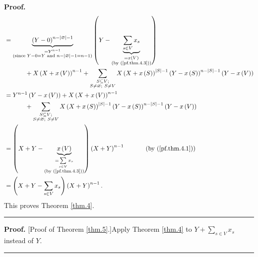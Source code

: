 \documentclass[numbers=enddot,12pt,final,onecolumn,notitlepage]{scrartcl}%
\theoremstyle{definition}
\newenvironment{proof}[1][Proof]{\noindent\textbf{#1.} }{\ \rule{0.5em}{0.5em}}
\let\sumnonlimits\sum
\renewcommand{\sum}{\sumnonlimits\limits}
\newenvironment{verlong}{}{}
\newenvironment{vershort}{}{}
\begin{document}
\begin{verlong}
\begin{proof}
\begin{align*}
&  =\underbrace{\left(  Y-0\right)  ^{n-\left\vert \varnothing\right\vert -1}%
}_{\substack{=Y^{n-1}\\\text{(since }Y-0=Y\text{ and }n-\left\vert
\varnothing\right\vert -1=n-1\text{)}}}\left(  Y-\underbrace{\sum_{s\in
V}x_{s}}_{\substack{=x\left(  V\right)  \\\text{(by (\ref{pf.thm.4.3}))}%
}}\right) \\
&  \ \ \ \ \ \ \ \ \ \ +X\left(  X+x\left(  V\right)  \right)  ^{n-1}%
+\sum_{\substack{S\subseteq V;\\S\neq\varnothing;\ S\neq V}}X\left(
X+x\left(  S\right)  \right)  ^{\left\vert S\right\vert -1}\left(  Y-x\left(
S\right)  \right)  ^{n-\left\vert S\right\vert -1}\left(  Y-x\left(  V\right)
\right) \\
&  =Y^{n-1}\left(  Y-x\left(  V\right)  \right)  +X\left(  X+x\left(
V\right)  \right)  ^{n-1}\\
&  \ \ \ \ \ \ \ \ \ \ +\sum_{\substack{S\subseteq V;\\S\neq\varnothing
;\ S\neq V}}X\left(  X+x\left(  S\right)  \right)  ^{\left\vert S\right\vert
-1}\left(  Y-x\left(  S\right)  \right)  ^{n-\left\vert S\right\vert
-1}\left(  Y-x\left(  V\right)  \right) \\
&  =\left(  X+Y-\underbrace{x\left(  V\right)  }_{\substack{=\sum_{s\in
V}x_{s}\\\text{(by (\ref{pf.thm.4.3}))}}}\right)  \left(  X+Y\right)
^{n-1}\ \ \ \ \ \ \ \ \ \ \left(  \text{by (\ref{pf.thm.4.1})}\right) \\
&  =\left(  X+Y-\sum_{s\in V}x_{s}\right)  \left(  X+Y\right)  ^{n-1}.
\end{align*}
This proves Theorem \ref{thm.4}.
\end{proof}
\end{verlong}

\begin{vershort}
\begin{proof}
[Proof of Theorem \ref{thm.5}.]Apply Theorem \ref{thm.4} to $Y+\sum_{s\in
V}x_{s}$ instead of $Y$.
\end{proof}
\end{vershort}
\end{document}
